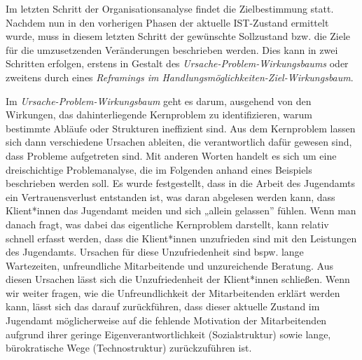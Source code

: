 \documentclass[
  letterpaper,
]{book}
\begin{document}
Im letzten Schritt der Organisationsanalyse findet die Zielbestimmung
statt. Nachdem nun in den vorherigen Phasen der aktuelle IST-Zustand
ermittelt wurde, muss in diesem letzten Schritt der gewünschte
Sollzustand bzw. die Ziele für die umzusetzenden Veränderungen
beschrieben werden. Dies kann in zwei Schritten erfolgen, erstens in
Gestalt des \emph{Ursache-Problem-Wirkungsbaums} oder zweitens durch
eines \emph{Reframings im Handlungsmöglichkeiten-Ziel-Wirkungsbaum}.

Im \emph{Ursache-Problem-Wirkungsbaum} geht es darum, ausgehend von den
Wirkungen, das dahinterliegende Kernproblem zu identifizieren, warum
bestimmte Abläufe oder Strukturen ineffizient sind. Aus dem Kernproblem
lassen sich dann verschiedene Ursachen ableiten, die verantwortlich
dafür gewesen sind, dass Probleme aufgetreten sind. Mit anderen Worten
handelt es sich um eine dreischichtige Problemanalyse, die im Folgenden
anhand eines Beispiels beschrieben werden soll. Es wurde festgestellt,
dass in die Arbeit des Jugendamts ein Vertrauensverlust entstanden ist,
was daran abgelesen werden kann, dass Klient*innen das Jugendamt meiden
und sich „allein gelassen'' fühlen. Wenn man danach fragt, was dabei das
eigentliche Kernproblem darstellt, kann relativ schnell erfasst werden,
dass die Klient*innen unzufrieden sind mit den Leistungen des
Jugendamts. Ursachen für diese Unzufriedenheit sind bspw. lange
Wartezeiten, unfreundliche Mitarbeitende und unzureichende Beratung. Aus
diesen Ursachen lässt sich die Unzufriedenheit der Klient*innen
schließen. Wenn wir weiter fragen, wie die Unfreundlichkeit der
Mitarbeitenden erklärt werden kann, lässt sich das darauf zurückführen,
dass dieser aktuelle Zustand im Jugendamt möglicherweise auf die
fehlende Motivation der Mitarbeitenden aufgrund ihrer geringe
Eigenverantwortlichkeit (Sozialstruktur) sowie lange, bürokratische Wege
(Technostruktur) zurückzuführen ist.
\end{document}
